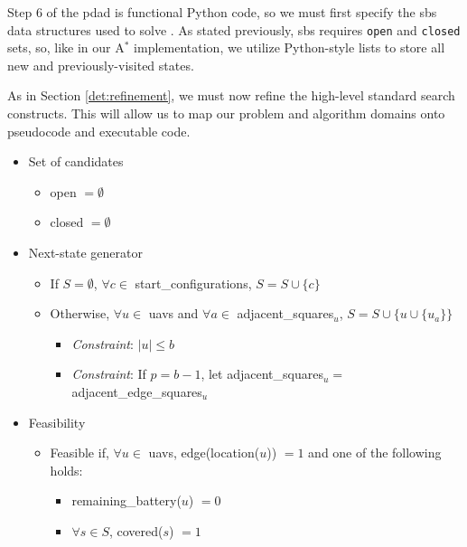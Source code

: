 \documentclass[../main.tex]{subfiles}
\begin{document}
Step 6 of the \ac{pdad} is functional Python code, so we must first specify the \ac{sbs} data structures used to solve \prob. As stated previously, \ac{sbs} requires \texttt{open} and \texttt{closed} sets, so, like in our A$^*$ implementation, we utilize Python-style lists to store all new and previously-visited states. 

As in Section \ref{det:refinement}, we must now refine the high-level standard search constructs. This will allow us to map our problem and algorithm domains onto pseudocode and executable code.

\begin{itemize}
    \item Set of candidates
    \begin{itemize}
        \item open $=\emptyset$
        \item closed $=\emptyset$
    \end{itemize}
    
    \item Next-state generator
    \begin{itemize}
        \item If $S=\emptyset$, $\forall c\in$ start\_configurations, $S=S\cup \{c\}$
        \item Otherwise, $\forall u\in$ \acp{uav} and $\forall a\in$ adjacent\_squares$_u$, $S=S\cup \{u\cup \{u_a\}\}$
        \begin{itemize}
            \item \textit{Constraint}: $|u|\leq b$
            \item \textit{Constraint}: If $p=b-1$, let adjacent\_squares$_u=$ adjacent\_edge\_squares$_u$
        \end{itemize}
    \end{itemize}
    
    \pagebreak

    \item Feasibility
    \begin{itemize}
        \item Feasible if, $\forall u\in$ \acp{uav}, edge(location($u$)) $=1$ and one of the following holds:
        \begin{itemize} 
            \item remaining\_battery($u$) $=0$
            \item $\forall s\in S$, covered($s$) $=1$
        \end{itemize}


\end{itemize}
\end{itemize}
\end{document}
